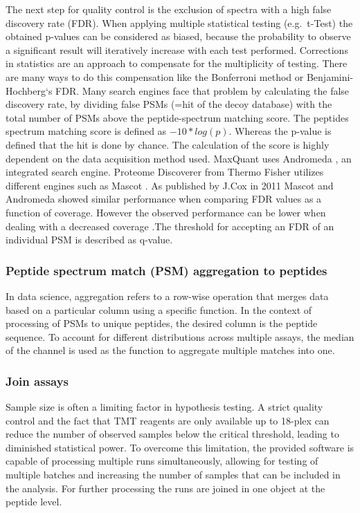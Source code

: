 \documentclass[
  11pt,
]{article}
\begin{document}
The next step for quality control is the exclusion of spectra with a high false discovery rate (FDR). When applying multiple statistical testing (e.g.~t-Test) the obtained p-values can be considered as biased, because the probability to observe a significant result will iteratively increase with each test performed. Corrections in statistics are an approach to compensate for the multiplicity of testing. There are many ways to do this compensation like the Bonferroni method or Benjamini-Hochberg`s FDR. Many search engines face that problem by calculating the false discovery rate, by dividing false PSMs (=hit of the decoy database) with the total number of PSMs above the peptide-spectrum matching score. The peptides spectrum matching score is defined as \(-10 * log(p)\). Whereas the p-value is defined that the hit is done by chance. The calculation of the score is highly dependent on the data acquisition method used. MaxQuant uses Andromeda \citep{Cox2011}, an integrated search engine. Proteome Discoverer from Thermo Fisher utilizes different engines such as Mascot \citep{Brosch2009}. As published by J.Cox in 2011 Mascot and Andromeda showed similar performance when comparing FDR values as a function of coverage. However the observed performance can be lower when dealing with a decreased coverage \citep{Cox2011}.The threshold for accepting an FDR of an individual PSM is described as q-value.

\hypertarget{peptide-spectrum-match-psm-aggregation-to-peptides}{%
\subsubsection{Peptide spectrum match (PSM) aggregation to peptides}\label{peptide-spectrum-match-psm-aggregation-to-peptides}}

In data science, aggregation refers to a row-wise operation that merges data based on a particular column using a specific function. In the context of processing of PSMs to unique peptides, the desired column is the peptide sequence. To account for different distributions across multiple assays, the median of the channel is used as the function to aggregate multiple matches into one.

\hypertarget{join-assays}{%
\subsubsection{Join assays}\label{join-assays}}

Sample size is often a limiting factor in hypothesis testing. A strict quality control and the fact that TMT reagents are only available up to 18-plex can reduce the number of observed samples below the critical threshold, leading to diminished statistical power. To overcome this limitation, the provided software is capable of processing multiple runs simultaneously, allowing for testing of multiple batches and increasing the number of samples that can be included in the analysis. For further processing the runs are joined in one object at the peptide level.
\end{document}
